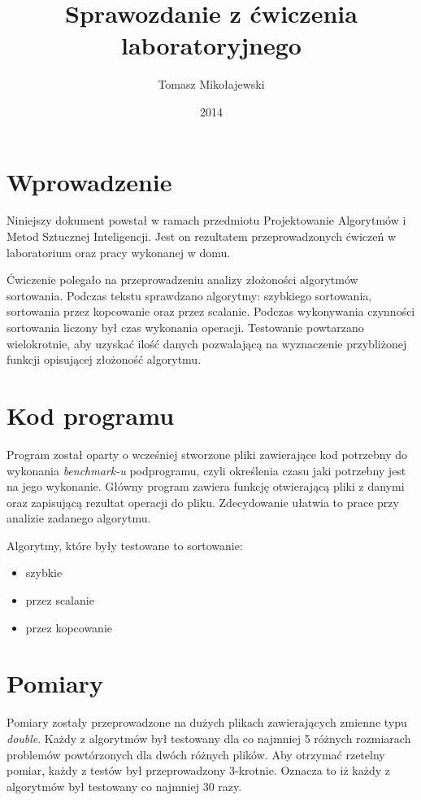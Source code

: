 \documentclass[12pt,a4paper,titlepage]{article}
\title{Sprawozdanie z ćwiczenia laboratoryjnego}
\date{2014}
\author{Tomasz Mikołajewski }
\begin{document}
\maketitle
\pagestyle{empty}
\tableofcontents

\section{Wprowadzenie}
Niniejszy dokument powstał w ramach przedmiotu Projektowanie Algorytmów i Metod Sztucznej Inteligencji. Jest on rezultatem przeprowadzonych ćwiczeń w laboratorium oraz pracy wykonanej w domu.


Ćwiczenie polegało na przeprowadzeniu analizy złożoności algorytmów sortowania. Podczas tekstu sprawdzano algorytmy: szybkiego sortowania, sortowania przez kopcowanie oraz przez scalanie. Podczas wykonywania czynności sortowania liczony był czas wykonania operacji. Testowanie powtarzano wielokrotnie, aby uzyskać ilość danych pozwalającą na wyznaczenie przybliżonej funkcji opisującej złożoność algorytmu. 

\section{Kod programu}
Program został oparty o wcześniej stworzone pliki zawierające kod potrzebny do wykonania \textit {benchmark-u} podprogramu, czyli określenia czasu jaki potrzebny jest na jego wykonanie. Główny program zawiera funkcję otwierającą pliki z danymi oraz zapisującą rezultat operacji do pliku. Zdecydowanie ułatwia to prace przy analizie zadanego algorytmu.

Algorytmy, które były testowane to sortowanie:
\begin{itemize}
\item szybkie
\item przez scalanie 
\item przez kopcowanie
\end{itemize}


\section{Pomiary}
Pomiary zostały przeprowadzone na dużych plikach zawierających zmienne typu \textit {double}. Każdy z algorytmów był testowany dla co najmniej 5 różnych rozmiarach problemów powtórzonych dla dwóch różnych plików. Aby otrzymać rzetelny pomiar, każdy z testów był przeprowadzony 3-krotnie. Oznacza to iż każdy z algorytmów był testowany co najmniej 30 razy. 
\end{document}
